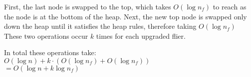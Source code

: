 \documentclass{article}
\begin{document}
\begin{enumerate}[label=(\alph*)]
\begin{enumerate}[label=(\arabic*)]
            First, the last node is swapped to the top,
            which takes $O(\log n_f)$ to reach as the node is at
            the bottom of the heap. 
            Next, the new top node is swapped only down the heap until
            it satisfies the heap rules, therefore taking $O(\log n_f)$
            These two operations occur $k$ times for each upgraded flier.

            In total these operations take: \\
            $O(\log n) + k\cdot (O(\log n_f) + O(\log n_f))$ \\
            $= O(\log n + k\log n_f)$

    \end{enumerate}

\end{enumerate}
\end{document}
